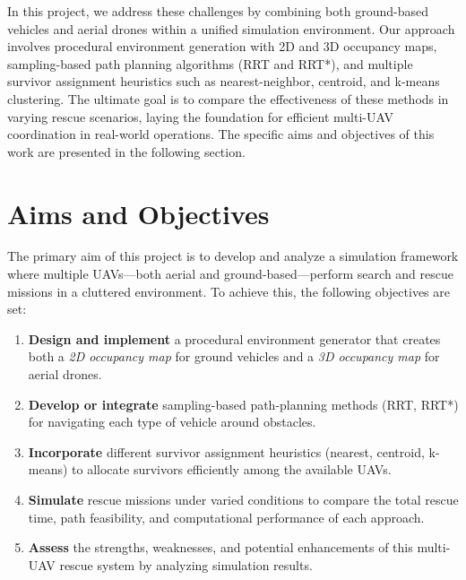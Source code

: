 \documentclass[12pt,a4paper]{report}
\begin{document}
In this project, we address these challenges by combining both ground-based 
vehicles and aerial drones within a unified simulation environment. Our approach 
involves procedural environment generation with 2D and 3D occupancy maps, sampling-based 
path planning algorithms (RRT and RRT*), and multiple survivor assignment heuristics 
such as nearest-neighbor, centroid, and k-means clustering. The ultimate goal is to 
compare the effectiveness of these methods in varying rescue scenarios, laying the 
foundation for efficient multi-UAV coordination in real-world operations. The specific 
aims and objectives of this work are presented in the following section.

\section{Aims and Objectives}

The primary aim of this project is to develop and analyze a simulation framework 
where multiple UAVs—both aerial and ground-based—perform search and rescue missions 
in a cluttered environment. To achieve this, the following objectives are set:

\begin{enumerate}
    \item \textbf{Design and implement} a procedural environment generator that creates 
          both a \emph{2D occupancy map} for ground vehicles and a \emph{3D occupancy map} 
          for aerial drones.

    \item \textbf{Develop or integrate} sampling-based path-planning methods 
          (RRT, RRT*) for navigating each type of vehicle around obstacles.

    \item \textbf{Incorporate} different survivor assignment heuristics 
          (nearest, centroid, k-means) to allocate survivors efficiently among the available UAVs.

    \item \textbf{Simulate} rescue missions under varied conditions to compare 
          the total rescue time, path feasibility, and computational performance 
          of each approach.

    \item \textbf{Assess} the strengths, weaknesses, and potential enhancements 
          of this multi-UAV rescue system by analyzing simulation results.
\end{enumerate}
\end{document}
